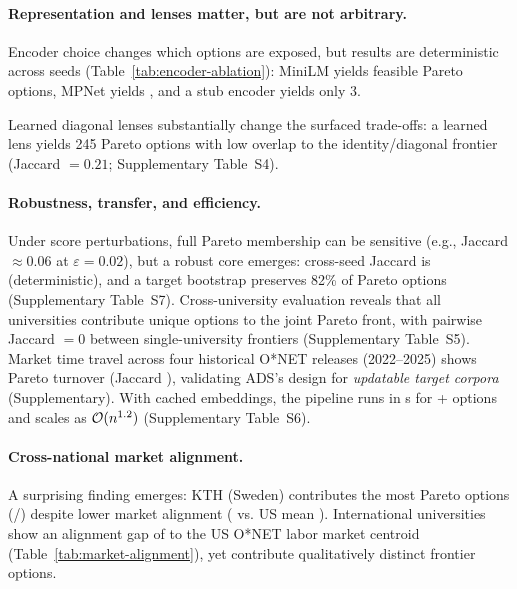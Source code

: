 \documentclass[sigconf,review]{acmart}
\newcommand{\ADS}{\textsc{ADS}\xspace}
\begin{document}


\paragraph{Representation and lenses matter, but are not arbitrary.}
Encoder choice changes which options are exposed, but results are deterministic across seeds (Table~\ref{tab:encoder-ablation}): MiniLM yields {\MiniLMParetoSize} feasible Pareto options, MPNet yields {\MPNetParetoSize}, and a stub encoder yields only $3$.



Learned diagonal lenses substantially change the surfaced trade-offs: a learned lens yields 245 Pareto options with low overlap to the identity/diagonal frontier (Jaccard $=0.21$; Supplementary Table~S4).

\paragraph{Robustness, transfer, and efficiency.}
Under score perturbations, full Pareto membership can be sensitive (e.g., Jaccard $\approx 0.06$ at $\varepsilon{=}0.02$), but a robust core emerges: cross-seed Jaccard is {\SeedStabilityJaccard} (deterministic), and a target bootstrap preserves 82\% of Pareto options (Supplementary Table~S7). Cross-university evaluation reveals that all {\NumUnisContributing} universities contribute unique options to the joint Pareto front, with pairwise Jaccard $=0$ between single-university frontiers (Supplementary Table~S5). {Market time travel} across four historical O*NET releases (2022--2025) shows {\MarketDriftTurnover} Pareto turnover (Jaccard {\MarketDriftJaccard}), validating \ADS's design for \emph{updatable target corpora} (Supplementary). With cached embeddings, the pipeline runs in {\MainRuntimeSec}s for {\HeadlineCourses}+ options and scales as $\mathcal{O}(n^{1.2})$ (Supplementary Table~S6).

\paragraph{Cross-national market alignment.}
A surprising finding emerges: KTH (Sweden) contributes the most Pareto options ({\ParetoKTH}/{\MainParetoSize}) despite lower market alignment ({\AlignKTH} vs. US mean {\AlignUSMean}). International universities show an alignment gap of {\AlignGap} to the US O*NET labor market centroid (Table~\ref{tab:market-alignment}), yet contribute qualitatively distinct frontier options.
\end{document}
